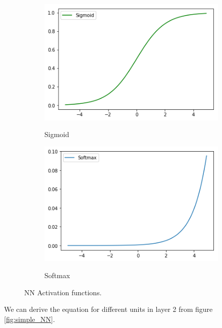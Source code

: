 \begin{figure}
\\
\begin{subfigure}{0.4\linewidth}
\includegraphics[width=\linewidth]{Figures/sigmoid_act.png}
	\label{sig}
          \caption{Sigmoid}
\end{subfigure}
\begin{subfigure}{0.4\linewidth}
\includegraphics[width=\linewidth]{Figures/softmax_act.png}
	\label{soft}
          \caption{Softmax}
\end{subfigure}
\caption{NN Activation functions.}
\label{actfn}
\end{figure}

We can derive the equation for different units in layer 2 from figure \ref{fig:simple_NN}.

